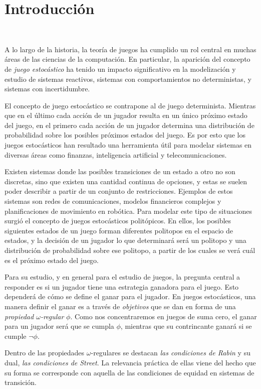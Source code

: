 \chapter{Introducción}
~\label{cap:intro}

A lo largo de la historia, la teoría de juegos ha cumplido un rol central en
muchas áreas de las ciencias de la computación. En particular, la aparición del
concepto de \textit{juego estocástico} ha tenido un impacto significativo en la
modelización y estudio de sistemas reactivos, sistemas con comportamientos no
deterministas, y sistemas con incertidumbre.

El concepto de juego estocástico se contrapone al de juego determinista.
Mientras que en el último cada acción de un jugador resulta en un único próximo
estado del juego, en el primero cada acción de un jugador determina una
distribución de probabilidad sobre los posibles próximos estados del juego. Es
por esto que los juegos estocásticos han resultado una herramienta útil para
modelar sistemas en diversas áreas como finanzas, inteligencia artificial y
telecomunicaciones.

Existen sistemas donde las posibles transiciones de un estado a otro no son
discretas, sino que existen una cantidad continua de opciones, y estas se
suelen poder describir a partir de un conjunto de restricciones. Ejemplos de
estos sistemas son redes de comunicaciones, modelos financieros complejos y
planificaciones de movimiento en robótica. Para modelar este tipo de
situaciones surgió el concepto de juegos estocásticos politópicos. En ellos,
los posibles siguientes estados de un juego forman diferentes politopos en el
espacio de estados, y la decisión de un jugador lo que determinará será un
politopo y una distribución de probabilidad sobre ese politopo, a partir de los
cuales se verá cuál es el próximo estado del juego.

Para su estudio, y en general para el estudio de juegos, la pregunta central a
responder es si un jugador tiene una estrategia ganadora para el juego. Esto
dependerá de cómo se define el ganar para el jugador. En juegos estocásticos,
una manera definir el ganar es a través de \textit{objetivos} que se dan en
forma de una \textit{propiedad $\omega$-regular} $\phi$. Como nos
concentraremos en juegos de suma cero, el ganar para un jugador será que se
cumpla $\phi$, mientras que su contrincante ganará si se cumple $\neg \phi$.

Dentro de las propiedades $\omega$-regulares se destacan \textit{las
	condiciones de Rabin} y su dual, \textit{las condiciones de Street}. La
relevancia práctica de ellas viene del hecho que su forma se corresponde con
aquella de las condiciones de equidad en sistemas de transición.

